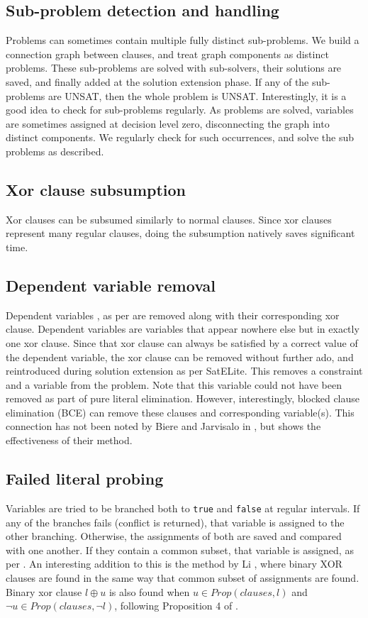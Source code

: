 \documentclass[final]{ieee}
\begin{document}
\subsection{Sub-problem detection and handling}
Problems can sometimes contain multiple fully distinct sub-problems. We build a connection graph between clauses, and treat graph components as distinct problems. These sub-problems are solved with sub-solvers, their solutions are saved, and finally added at the solution extension phase. If any of the sub-problems are UNSAT, then the whole problem is UNSAT. Interestingly, it is a good idea to check for sub-problems regularly. As problems are solved, variables are sometimes assigned at decision level zero, disconnecting the graph into distinct components. We regularly check for such occurrences, and solve the sub problems as described.

\subsection{Xor clause subsumption}
Xor clauses can be subsumed similarly to normal clauses. Since xor clauses represent many regular clauses, doing the subsumption natively saves significant time.

\subsection{Dependent variable removal}
Dependent variables , as per \cite{Heule-phd} are removed along with their corresponding xor clause. Dependent variables are variables that appear nowhere else but in exactly one xor clause. Since that xor clause can always be satisfied by a correct value of the dependent variable, the xor clause can be removed without further ado, and reintroduced during solution extension as per SatELite. This removes a constraint and a variable from the problem. Note that this variable could not have been removed as part of pure literal elimination. However, interestingly, blocked clause elimination (BCE) can remove these clauses and corresponding variable(s). This connection has not been noted by Biere and Jarvisalo in \cite{DBLP:conf/tacas/JarvisaloBH10}, but shows the effectiveness of their method.

\subsection{Failed literal probing}
Variables are tried to be branched both to \texttt{true} and \texttt{false} at regular intervals. If any of the branches fails (conflict is returned), that variable is assigned to the other branching. Otherwise, the assignments of both are saved and compared with one another. If they contain a common subset, that variable is assigned, as per \cite{DBLP:journals/endm/Berre01}. An interesting addition to this is the method by Li \cite{DBLP:journals/dam/Li03}, where binary XOR clauses are found in the same way that common subset of assignments are found. Binary xor clause $l\oplus u$ is also found when  $u\in Prop(clauses, l)$ and $\neg u\in Prop(clauses, \neg l)$, following Proposition 4 of \cite{DBLP:journals/endm/Berre01}.
\end{document}
